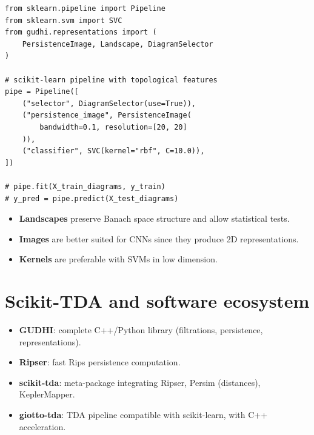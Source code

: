 \begin{verbatim}
from sklearn.pipeline import Pipeline
from sklearn.svm import SVC
from gudhi.representations import (
    PersistenceImage, Landscape, DiagramSelector
)

# scikit-learn pipeline with topological features
pipe = Pipeline([
    ("selector", DiagramSelector(use=True)),
    ("persistence_image", PersistenceImage(
        bandwidth=0.1, resolution=[20, 20]
    )),
    ("classifier", SVC(kernel="rbf", C=10.0)),
])

# pipe.fit(X_train_diagrams, y_train)
# y_pred = pipe.predict(X_test_diagrams)
\end{verbatim}

\begin{attention}[title=\textbf{Choosing a vectorization}]
\begin{itemize}
  \item \textbf{Landscapes} preserve Banach space structure and
        allow statistical tests.
  \item \textbf{Images} are better suited for CNNs since they
        produce 2D representations.
  \item \textbf{Kernels} are preferable with SVMs in low dimension.
\end{itemize}
\end{attention}

\section{Scikit-TDA and software ecosystem}
\label{sec:scikit_tda}

\begin{remark}
\begin{itemize}
  \item \textbf{GUDHI}: complete C++/Python library (filtrations,
        persistence, representations).
  \item \textbf{Ripser}: fast Rips persistence computation.
  \item \textbf{scikit-tda}: meta-package integrating Ripser,
        Persim (distances), KeplerMapper.
  \item \textbf{giotto-tda}: TDA pipeline compatible with
        scikit-learn, with C++ acceleration.
\end{itemize}
\end{remark}

